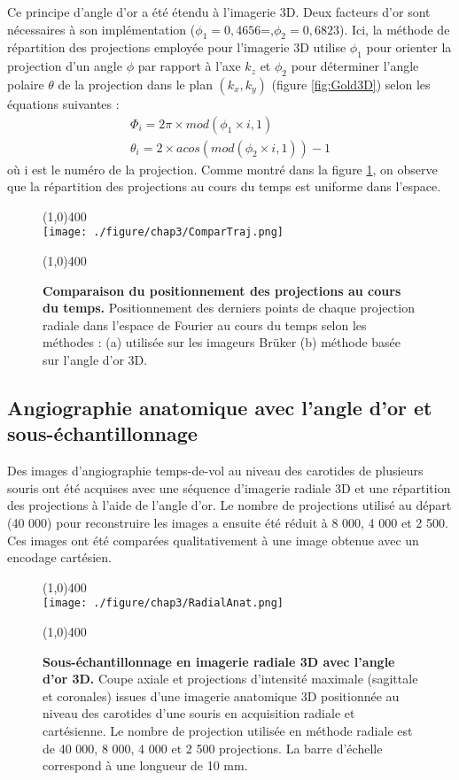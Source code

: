 Ce principe d'angle d'or a été étendu à l'imagerie 3D. Deux facteurs d'or sont nécessaires à son implémentation ($\phi_1=0,4656$=,$\phi_2=0,6823$). Ici, la méthode de répartition des projections employée pour l'imagerie 3D utilise $\phi_1$ pour orienter la projection d'un angle $\phi$ par rapport à l'axe $k_z$ et $\phi_2$ pour déterminer l'angle polaire $\theta$ de la projection dans le plan $(k_x,k_y)$ (figure \ref{fig:Gold3D}) selon les équations suivantes :
\begin{equation}
\label{eq:GoldPremier}
\begin{array}{c}
\Phi_i=2\pi \times mod(\phi_1 \times i,1) \\
\theta_i=2 \times acos(mod(\phi_2 \times i,1)) -1
\end{array}
\end{equation}
où i est le numéro de la projection. Comme montré dans la figure \ref{fig:ComparTraj}, on observe que la répartition des projections au cours du temps est uniforme dans l'espace.

\begin{figure}[h]
\centering \line(1,0){400} \\
\texttt{[image: ./figure/chap3/ComparTraj.png]}
\caption[Comparaison du positionnement des projections au cours du temps.]{\label{fig:ComparTraj} \textbf{Comparaison du positionnement des projections au cours du temps.} Positionnement des derniers points de chaque projection radiale dans l'espace de Fourier au cours du temps selon les méthodes : (a) utilisée sur les imageurs Brüker (b) méthode basée sur l'angle d'or 3D.}
\line(1,0){400} \\ \end{figure}

\subsection{Angiographie anatomique avec l'angle d'or et sous-échantillonnage}

Des images d'angiographie temps-de-vol au niveau des carotides de plusieurs souris ont été acquises avec une séquence d'imagerie radiale 3D et une répartition des projections à l'aide de l'angle d'or. Le nombre de projections utilisé au départ (40 000) pour reconstruire les images a ensuite été réduit à 8 000, 4 000 et 2 500. Ces images ont été comparées qualitativement à une image obtenue avec un encodage cartésien.

\begin{figure}[H]
\centering \line(1,0){400} \\
\texttt{[image: ./figure/chap3/RadialAnat.png]}
\caption[Sous-échantillonnage en imagerie radiale 3D avec l'angle d'or 3D.]{\label{fig:RadialAnat} \textbf{Sous-échantillonnage en imagerie radiale 3D avec l'angle d'or 3D.}  Coupe axiale et projections d'intensité maximale (sagittale et coronales) issues d'une imagerie anatomique 3D positionnée au niveau des carotides d'une souris en acquisition radiale et cartésienne. Le nombre de projection utilisée en méthode radiale est de 40 000, 8 000, 4 000 et 2 500 projections. La barre d'échelle correspond à une longueur de 10 mm. }
\line(1,0){400} \\ \end{figure}


